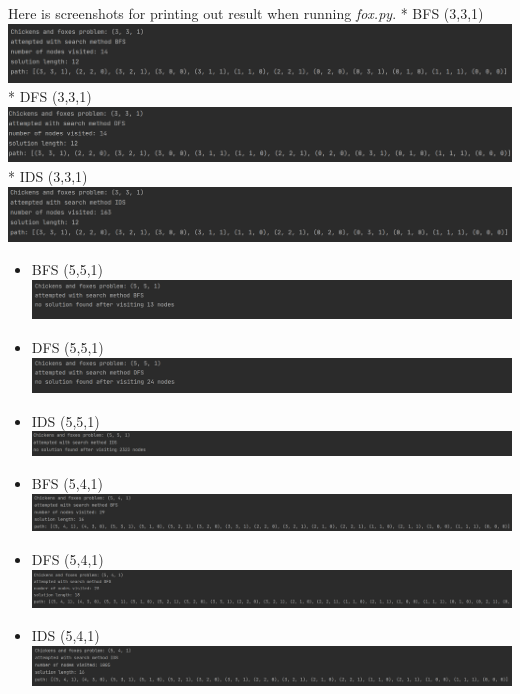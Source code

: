 \documentclass[]{article}
\begin{document}
Here is screenshots for printing out result when running \emph{fox.py}.
* BFS (3,3,1) \includegraphics{images/BFS331.PNG} * DFS (3,3,1)
\includegraphics{images/DFS331.PNG} * IDS (3,3,1)
\includegraphics{images/IDS331.PNG}

\begin{itemize}
\item
  BFS (5,5,1) \includegraphics{images/BFS551.PNG}
\item
  DFS (5,5,1) \includegraphics{images/DFS551.PNG}
\item
  IDS (5,5,1) \includegraphics{images/IDS551.PNG}
\item
  BFS (5,4,1) \includegraphics{images/BFS541.PNG}
\item
  DFS (5,4,1) \includegraphics{images/DFS541.PNG}
\item
  IDS (5,4,1) \includegraphics{images/IDS541.PNG}
\end{itemize}
\end{document}
